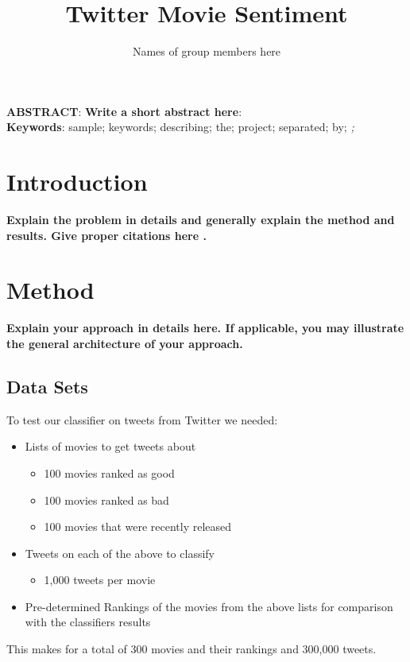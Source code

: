 \documentclass[12pt]{article}
\begin{document}
\title{Twitter Movie Sentiment}

\author{Names of group members here}

\maketitle


\noindent \textbf{ABSTRACT}: \textbf{Write a short abstract here}: \lipsum[1-1]
~\\ 
\textbf{Keywords}: sample; keywords; describing; the; project; separated; by; \textit{;}

\section{Introduction}\label{S:1}
\textbf{Explain the problem in details and generally explain the method and results. Give proper citations here \cite{Smith:2013jd}	.} \lipsum[1-6]
\section{Method}\label{S:2}
\textbf{Explain your approach in details here. If applicable, you may illustrate the general architecture of your approach.}
\subsection{Data Sets}\label{S:3}
To test our classifier on tweets from Twitter we needed: 
\begin{itemize}
  \item Lists of movies to get tweets about
  	\begin{itemize}
  		\item 100 movies ranked as good
  		\item 100 movies ranked as bad
  		\item 100 movies that were recently released
  	\end{itemize}
  \item Tweets on each of the above  to classify
  	\begin{itemize}
  		\item 1,000 tweets per movie
  	\end{itemize}
  \item Pre-determined Rankings of the movies from the above lists for comparison with the classifiers results
\end{itemize}
This makes for a total of 300 movies and their rankings and 300,000 tweets.
\end{document}
